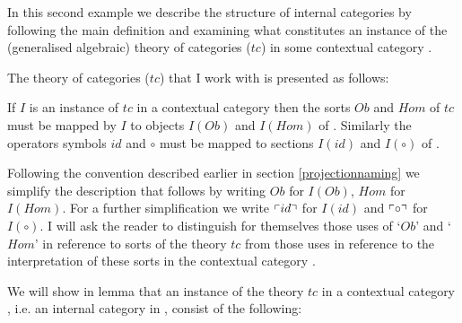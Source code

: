 In this second example we describe the structure of internal categories by following the main definition and examining
what constitutes an instance of the (generalised algebraic) theory of categories ($tc$) in some 
 contextual category \catc.

The theory of categories ($tc$) that I work with is presented as follows:


\iffalse
\begin{gatrules}
\gatintros
\gatintroducing{Ob}
\isT{Ob} \\
\gatintroducing{Hom}
  \gatsingular{\ofT{x_1,x_2}{Ob}}{\isT{Hom(x_1,x_2)}} \\	
\gatintroducing{id}
  \gatsingular{\ofT{w}{Ob}}{\ofT{id(w)}{Hom(w,w)}} \\	
\gataxioms
\gatintroducing{  \gataxiomno{1} \\   \gataxiomno{2}}
\begin{gatgroup}{\ofT{f}{Hom(x_1,x_2)},\ \ofT{x_1,x_2}{Ob}}
    \gatleaf{}{id_{x_1} \circ f = f} \\
    \gatleaf{}{f \circ id_{x_2} = f}
\end{gatgroup} \\
\gatintroducing{ \gataxiomno{3} }
\gatsingular{\associativitypremisereversed}{(f \circ g) \circ h = f \circ (g \circ h)} 
\end{gatrules}
\fi

If $I$ is an instance of $tc$ in a contextual category \catcw then the sorts $Ob$ and $Hom$ of $tc$ 
must be mapped by $I$  to objects $I(Ob)$ and  $I(Hom)$ of \catc.
Similarly  the operators symbols
$id$ and $\circ$ must be mapped to sections $I(id)$ and $I(\circ)$ of \catc.

Following the convention described earlier in section \ref{projectionnaming} we simplify  
the description that follows by writing $Ob$ for $I(Ob)$, $Hom$ for $I(Hom)$.
For a further simplification we write $\left\ulcorner id\right\urcorner$ for $I(id)$ and   $\left\ulcorner\circ\right\urcorner$ for $I(\circ)$.   I will ask the reader  to distinguish for themselves 
those uses of `$Ob$' and `$Hom$' in reference to sorts of the theory $tc$ from those uses in reference to the interpretation of these sorts in the contextual category \catc. 

We will show in lemma  that an instance of the theory $tc$ in a contextual category \catcw, 
i.e. an internal category in \catcw, 
consist of the following:

